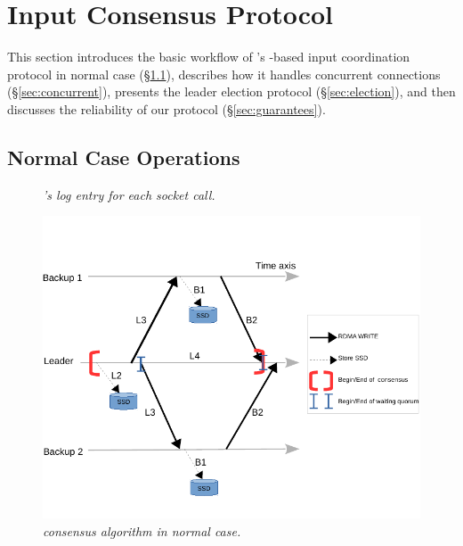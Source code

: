 \section{Input Consensus Protocol} \label{sec:input}

This section introduces the basic workflow of \xxx's \paxos-based input 
coordination protocol in normal case (\S\ref{sec:normal}), describes how it 
handles concurrent connections (\S\ref{sec:concurrent}), presents the leader 
election protocol (\S\ref{sec:election}), and then discusses the reliability 
of our protocol (\S\ref{sec:guarantees}).

\subsection{Normal Case Operations} \label{sec:normal}

\begin{figure}[t]
\centering
\begin{minipage}{.5\textwidth}
\end{minipage}
\vspace{-.1in}
\caption{{\em \xxx's log entry for each socket call.}} \label{fig:logentry}
\vspace{-.05in}
\end{figure}

\begin{figure}[t]
\centering
\vspace{-0.15in}
\includegraphics[width=.48\textwidth]{figures/consensus}
\vspace{-.4in}
\caption{{\em \xxx consensus algorithm in normal case.}} \label{fig:consensus}
\vspace{-.05in}
\end{figure}


